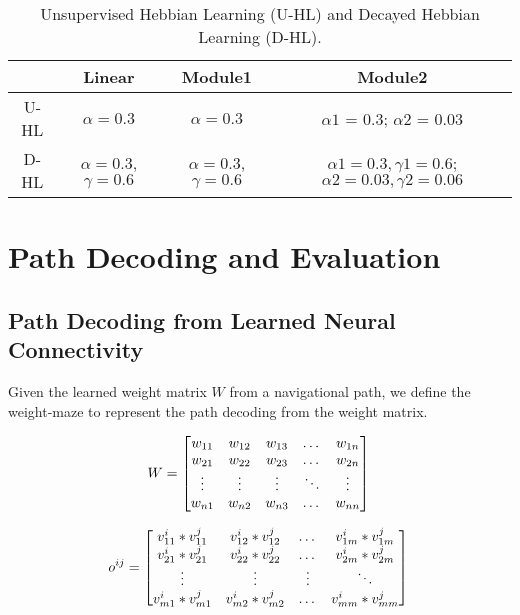 \documentclass[11pt, letterpaper, onecolumn]{article}
\begin{document}
\begin{table}[!htbp]
\centering
\caption{Unsupervised Hebbian Learning (U-HL) and Decayed Hebbian Learning (D-HL). }
\label{tab:hl}
\begin{tabular}{c|c|c|c}
\hline
& Linear      & Module1 & Module2  \\ \hline
       U-HL &  $\alpha = 0.3$ & $\alpha = 0.3$ & $\alpha1$ = 0.3; $\alpha2$ = 0.03 \\ \hline
       D-HL &  $\alpha = 0.3$, $\gamma = 0.6$ & $\alpha = 0.3$, $\gamma = 0.6$ & $\alpha1 = 0.3, \gamma1 = 0.6$; $\alpha2 = 0.03, \gamma2 = 0.06$ \\ \hline
\end{tabular}
\end{table}


\section{Path Decoding and Evaluation}

\subsection{Path Decoding from Learned Neural Connectivity}
Given the learned weight matrix $W$ from a navigational path, we define the weight-maze to represent the path decoding from the weight matrix.

\begin{equation}
\label{eq:dec1}
    W \\
    = 
\begin{bmatrix}
    w_{11}       & w_{12} & w_{13} & \dots & w_{1n} \\
    w_{21}       & w_{22} & w_{23} & \dots & w_{2n} \\
    \vdots & \vdots & \vdots & \ddots & \vdots \\
    w_{n1}       & w_{n2} & w_{n3} & \dots & w_{nn} \\
\end{bmatrix} \\
\end{equation}

\begin{equation}
\label{eq:dec2}
    o^{ij} \\
    = 
\begin{bmatrix}
    v^{i}_{11}*v^{j}_{11} & v^{i}_{12}*v^{j}_{12} & \dots  & v^{i}_{1m}*v^{j}_{1m} \\
    v^{i}_{21}*v^{j}_{21} & v^{i}_{22}*v^{j}_{22} & \dots  & v^{i}_{2m}*v^{j}_{2m} \\
    \vdots & \vdots & \vdots & \ddots \\
    v^{i}_{m1}*v^{j}_{m1} & v^{i}_{m2}*v^{j}_{m2} & \dots  & v^{i}_{mm}*v^{j}_{mm} \\
\end{bmatrix} \\
\end{equation}
\end{document}
